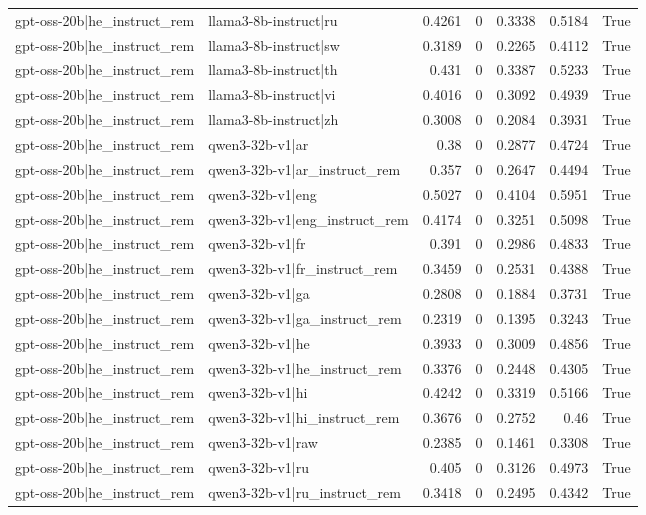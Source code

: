 \begin{table}
\begin{tabular}{l l r r r r l}
gpt-oss-20b|he_instruct_rem & llama3-8b-instruct|ru & 0.4261 & 0 & 0.3338 & 0.5184 & True \\
gpt-oss-20b|he_instruct_rem & llama3-8b-instruct|sw & 0.3189 & 0 & 0.2265 & 0.4112 & True \\
gpt-oss-20b|he_instruct_rem & llama3-8b-instruct|th & 0.431 & 0 & 0.3387 & 0.5233 & True \\
gpt-oss-20b|he_instruct_rem & llama3-8b-instruct|vi & 0.4016 & 0 & 0.3092 & 0.4939 & True \\
gpt-oss-20b|he_instruct_rem & llama3-8b-instruct|zh & 0.3008 & 0 & 0.2084 & 0.3931 & True \\
gpt-oss-20b|he_instruct_rem & qwen3-32b-v1|ar & 0.38 & 0 & 0.2877 & 0.4724 & True \\
gpt-oss-20b|he_instruct_rem & qwen3-32b-v1|ar_instruct_rem & 0.357 & 0 & 0.2647 & 0.4494 & True \\
gpt-oss-20b|he_instruct_rem & qwen3-32b-v1|eng & 0.5027 & 0 & 0.4104 & 0.5951 & True \\
gpt-oss-20b|he_instruct_rem & qwen3-32b-v1|eng_instruct_rem & 0.4174 & 0 & 0.3251 & 0.5098 & True \\
gpt-oss-20b|he_instruct_rem & qwen3-32b-v1|fr & 0.391 & 0 & 0.2986 & 0.4833 & True \\
gpt-oss-20b|he_instruct_rem & qwen3-32b-v1|fr_instruct_rem & 0.3459 & 0 & 0.2531 & 0.4388 & True \\
gpt-oss-20b|he_instruct_rem & qwen3-32b-v1|ga & 0.2808 & 0 & 0.1884 & 0.3731 & True \\
gpt-oss-20b|he_instruct_rem & qwen3-32b-v1|ga_instruct_rem & 0.2319 & 0 & 0.1395 & 0.3243 & True \\
gpt-oss-20b|he_instruct_rem & qwen3-32b-v1|he & 0.3933 & 0 & 0.3009 & 0.4856 & True \\
gpt-oss-20b|he_instruct_rem & qwen3-32b-v1|he_instruct_rem & 0.3376 & 0 & 0.2448 & 0.4305 & True \\
gpt-oss-20b|he_instruct_rem & qwen3-32b-v1|hi & 0.4242 & 0 & 0.3319 & 0.5166 & True \\
gpt-oss-20b|he_instruct_rem & qwen3-32b-v1|hi_instruct_rem & 0.3676 & 0 & 0.2752 & 0.46 & True \\
gpt-oss-20b|he_instruct_rem & qwen3-32b-v1|raw & 0.2385 & 0 & 0.1461 & 0.3308 & True \\
gpt-oss-20b|he_instruct_rem & qwen3-32b-v1|ru & 0.405 & 0 & 0.3126 & 0.4973 & True \\
gpt-oss-20b|he_instruct_rem & qwen3-32b-v1|ru_instruct_rem & 0.3418 & 0 & 0.2495 & 0.4342 & True \\

\end{tabular}
\end{table}
